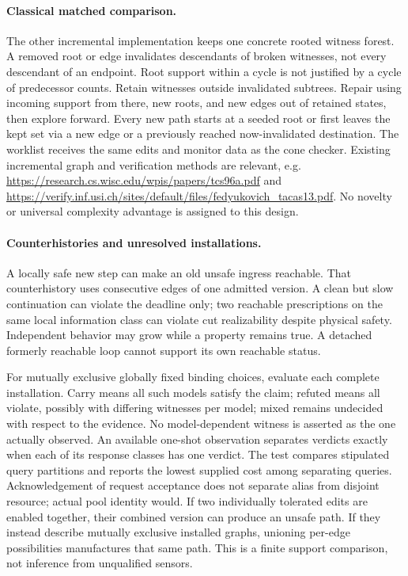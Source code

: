 \documentclass{article}
\begin{document}
\paragraph{Classical matched comparison.}
The other incremental implementation keeps one concrete rooted witness
forest. A removed root or edge invalidates descendants of broken
witnesses, not every descendant of an endpoint. Root support within a
cycle is not justified by a cycle of predecessor counts. Retain witnesses
outside invalidated subtrees. Repair using incoming support from there,
new roots, and new edges out of retained states, then explore forward.
Every new path starts at a seeded root or first leaves the kept set via a
new edge or a previously reached now-invalidated destination.
The worklist receives the same edits and monitor data as the cone checker.
Existing incremental graph and verification methods are relevant, e.g.
\url{https://research.cs.wisc.edu/wpis/papers/tcs96a.pdf} and
\url{https://verify.inf.usi.ch/sites/default/files/fedyukovich_tacas13.pdf}.
No novelty or universal complexity advantage is assigned to this design.

\paragraph{Counterhistories and unresolved installations.}
A locally safe new step can make an old unsafe ingress reachable.
That counterhistory uses consecutive edges of one admitted version.
A clean but slow continuation can violate the deadline only;
two reachable prescriptions on the same local information class can
violate cut realizability despite physical safety. Independent behavior
may grow while a property remains true. A detached formerly reachable
loop cannot support its own reachable status.

For mutually exclusive globally fixed binding choices, evaluate each
complete installation. Carry means all such models satisfy the claim;
refuted means all violate, possibly with differing witnesses per
model; mixed remains undecided with respect to the evidence.
No model-dependent witness is asserted as the one actually observed.
An available one-shot observation separates verdicts exactly when each
of its response classes has one verdict. The test compares stipulated
query partitions and reports the lowest supplied cost among separating
queries. Acknowledgement of request acceptance does not separate alias
from disjoint resource; actual pool identity would.
If two individually tolerated edits are enabled together,
their combined version can produce an unsafe path. If they instead
describe mutually exclusive installed graphs, unioning per-edge
possibilities manufactures that same path. This is a finite support
comparison, not inference from unqualified sensors.
\end{document}
